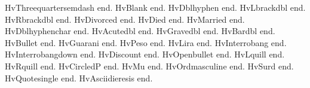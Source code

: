 \documentclass{article}
\begin{document}
{\selectfont
HvThreequartersemdash \textthreequartersemdash{} end.
HvBlank \textblank{} end.
HvDblhyphen \textdblhyphen{} end.
HvLbrackdbl \textlbrackdbl{} end.
HvRbrackdbl \textrbrackdbl{} end.
HvDivorced \textdivorced{} end.
HvDied \textdied{} end.
HvMarried \textmarried{} end.
HvDblhyphenchar \textdblhyphenchar{} end.
HvAcutedbl \textacutedbl{} end.
HvGravedbl \textgravedbl{} end.
HvBardbl \textbardbl{} end.
HvBullet \textbullet{} end.
HvGuarani \textguarani{} end.
HvPeso \textpeso{} end.
HvLira \textlira{} end.
HvInterrobang \textinterrobang{} end.
HvInterrobangdown \textinterrobangdown{} end.
HvDiscount \textdiscount{} end.
HvOpenbullet \textopenbullet{} end.
HvLquill \textlquill{} end.
HvRquill \textrquill{} end.
HvCircledP \textcircledP{} end.
HvMu \textmu{} end.
HvOrdmasculine \textordmasculine{} end.
HvSurd \textsurd{} end.
HvQuotesingle \textquotesingle{} end.
HvAsciidieresis \textasciidieresis{} end.}
\end{document}
